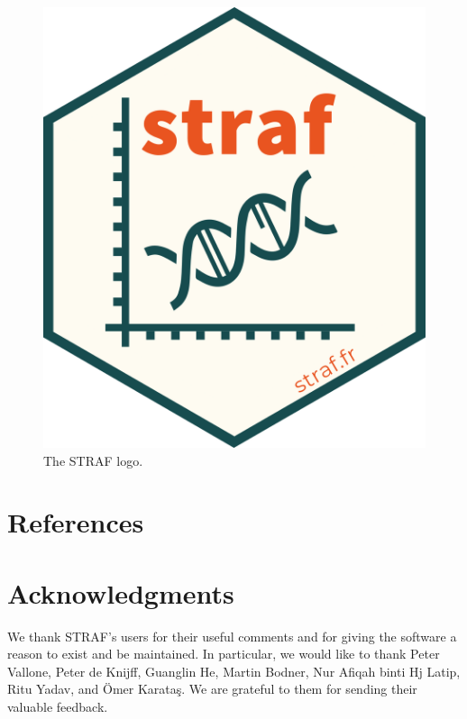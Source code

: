 \documentclass[
]{book}
\begin{document}
\begin{figure}
\includegraphics[width=1\linewidth]{img/straf-logo} \caption{The STRAF logo.}\label{fig:straf-logo}
\end{figure}

\hypertarget{references}{%
\chapter{References}\label{references}}

\hypertarget{refs}{}

\hypertarget{acknowledgments}{%
\chapter{Acknowledgments}\label{acknowledgments}}

We thank STRAF's users for their useful comments and for giving the software
a reason to exist and be maintained. In particular, we would like to thank
Peter Vallone, Peter de Knijff, Guanglin He, Martin Bodner,
Nur Afiqah binti Hj Latip, Ritu Yadav, and Ömer Karataş.
We are grateful to them for sending their valuable feedback.
\end{document}
